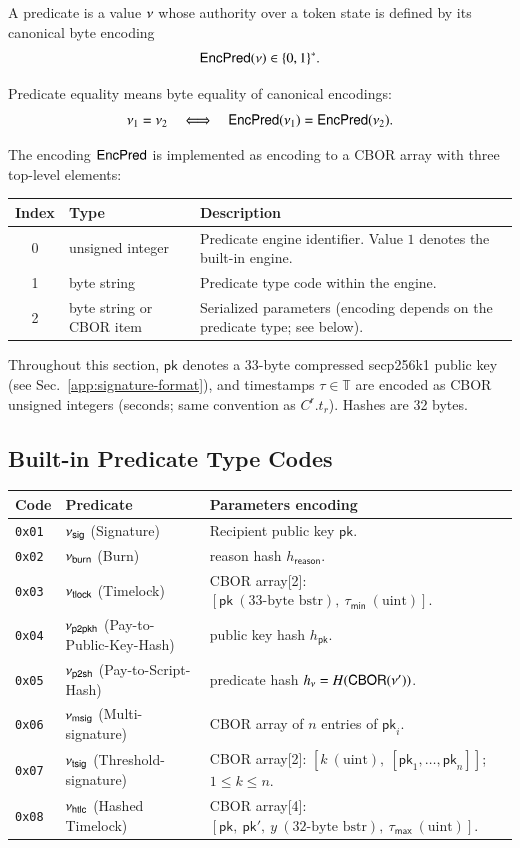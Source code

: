 A predicate is a value $\nu$ whose authority over a token state is defined by its canonical byte encoding
\[
\mathsf{EncPred}(\nu) \in \{0,1\}^* .
\]

Predicate equality means byte equality of canonical encodings:
\[
\nu_1 = \nu_2 \quad\Longleftrightarrow\quad
\mathsf{EncPred}(\nu_1) = \mathsf{EncPred}(\nu_2).
\]

The encoding $\mathsf{EncPred}$ is implemented as encoding to a CBOR array with three top-level elements:

\begin{longtable}{clp{8cm}}
\textbf{Index} & \textbf{Type} & \textbf{Description} \\
\hline
0 & unsigned integer & Predicate engine identifier. Value $1$ denotes the built-in engine. \\
1 & byte string & Predicate type code within the engine. \\
2 & byte string or CBOR item & Serialized parameters (encoding depends on the predicate type; see below). \\
\end{longtable}

\noindent Throughout this section, $\mathsf{pk}$ denotes a 33-byte compressed secp256k1 public key (see Sec.~\ref{app:signature-format}), and timestamps $\tau \in \mathbb{T}$ are encoded as CBOR unsigned integers (seconds; same convention as $C^\mathsf{r}.t_r$). Hashes are 32 bytes.

\subsection{Built-in Predicate Type Codes}

\begin{longtable}{llp{10cm}}
\textbf{Code} & \textbf{Predicate} & \textbf{Parameters encoding} \\
\hline
\endhead
\texttt{0x01} & $\nu_\mathsf{sig}$ (Signature) & Recipient public key $\mathsf{pk}$. \\
\texttt{0x02} & $\nu_\mathsf{burn}$ (Burn) & reason hash $h_\mathsf{reason}$. \\
\texttt{0x03} & $\nu_\mathsf{tlock}$ (Timelock) & CBOR array[2]: $[\mathsf{pk}\ (33\text{-byte bstr}),\ \tau_\mathsf{min}\ (\text{uint})]$. \\
\texttt{0x04} & $\nu_\mathsf{p2pkh}$ (Pay-to-Public-Key-Hash) & public key hash $h_\mathsf{pk}$. \\
\texttt{0x05} & $\nu_\mathsf{p2sh}$ (Pay-to-Script-Hash) & predicate hash $h_\nu = H(\mathsf{CBOR}(\nu'))$. \\
\texttt{0x06} & $\nu_\mathsf{msig}$ (Multi-signature) & CBOR array of $n$ entries of $\mathsf{pk}_i$. \\
\texttt{0x07} & $\nu_\mathsf{tsig}$ (Threshold-signature) & CBOR array[2]: $[k\ (\text{uint}),\ [\mathsf{pk}_1,\ldots,\mathsf{pk}_n]]$; $1 \le k \le n$. \\
\texttt{0x08} & $\nu_\mathsf{htlc}$ (Hashed Timelock) & CBOR array[4]: $[\mathsf{pk},\ \mathsf{pk}',\ y\ (32\text{-byte bstr}),\ \tau_\mathsf{max}\ (\text{uint})]$. \\
\end{longtable}

